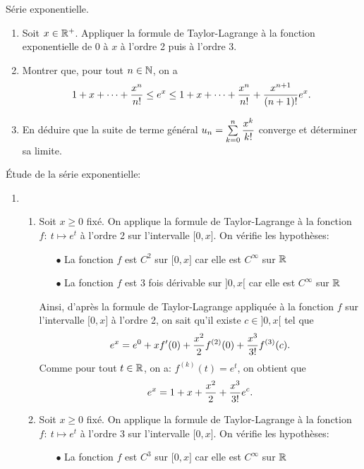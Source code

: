 \documentclass[a4paper, 11pt,reqno]{article}
\begin{document}
\begin{exercice} S\'erie exponentielle.
	\begin{enumerate}
		\item Soit $x\in\mathbb{R}^+$. Appliquer la formule de Taylor-Lagrange \`a la fonction exponentielle de 0 \`a $x$ \`a l'ordre 2 puis \`a l'ordre 3.
		\item Montrer que, pour tout $n\in\mathbb{N}$, on a
		      $$1+x+\dots+\displaystyle\frac{x^n}{n!}\leq e^x\leq 1+x+\dots+\displaystyle\frac{x^n}{n!}+\displaystyle\frac{x^{n+1}}{(n+1)!}e^x.$$
		\item En d\'eduire que la suite de terme g\'en\'eral $u_n=\sum\limits_{k=0}^n \displaystyle\frac{x^k}{k!}$ converge et d\'eterminer sa limite.
	\end{enumerate}
\end{exercice}
\begin{correction}
	\'Etude de la s\'erie exponentielle:
	\begin{enumerate}
		\item
		      \begin{enumerate}
			      \item Soit $x\geq 0$ fix\'e. On applique la formule de Taylor-Lagrange \`a la fonction $f:\ t\mapsto e^t$ \`a l'ordre 2 sur l'intervalle $\lbrack 0,x\rbrack$. On v\'erifie les hypoth\`eses:
			            \begin{itemize}
				            \item[$\bullet$] La fonction $f$ est $C^2$ sur $\lbrack 0,x\rbrack$ car elle est $C^{\infty}$ sur $\mathbb{R}$
				            \item[$\bullet$] La fonction $f$ est 3 fois d\'erivable sur $\rbrack 0,x\lbrack$ car elle est $C^{\infty}$ sur $\mathbb{R}$
			            \end{itemize}
			            Ainsi, d'apr\`es la formule de Taylor-Lagrange appliqu\'ee \`a la fonction $f$ sur l'intervalle $\lbrack 0,x\rbrack$ \`a l'ordre 2, on sait qu'il existe $c\in\rbrack 0,x\lbrack$ tel que
			            $$e^x=e^0+xf^{\prime}(0)+\displaystyle\frac{x^2}{2}f^{(2)}(0)+\displaystyle\frac{x^3}{3!}f^{(3)}(c).$$
			            Comme pour tout $t\in\mathbb{R}$, on a: $f^{(k)}(t)=e^t$, on obtient que
			            $$e^x=1+x+\displaystyle\frac{x^2}{2}+\displaystyle\frac{x^3}{3!}e^c.$$
			      \item Soit $x\geq 0$ fix\'e. On applique la formule de Taylor-Lagrange \`a la fonction $f:\ t\mapsto e^t$ \`a l'ordre 3 sur l'intervalle $\lbrack 0,x\rbrack$. On v\'erifie les hypoth\`eses:
			            \begin{itemize}
				            \item[$\bullet$] La fonction $f$ est $C^3$ sur $\lbrack 0,x\rbrack$ car elle est $C^{\infty}$ sur $\mathbb{R}$

\end{itemize}
\end{enumerate}
\end{enumerate}
\end{correction}
\end{document}
